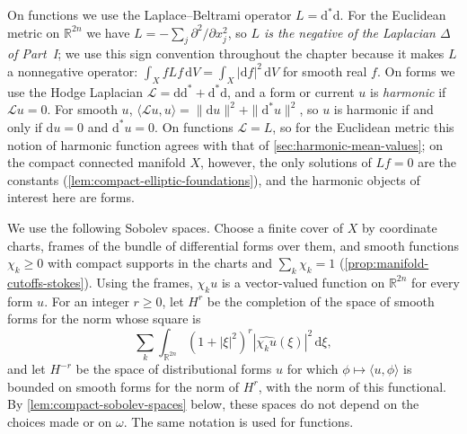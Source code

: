 On functions we use the Laplace--Beltrami operator $L=\mathrm d^*\mathrm d$. For the Euclidean metric on $\mathbb R^{2n}$ we have $L=-\sum_j\partial^2/\partial x_j^2$, so \emph{$L$ is the negative of the Laplacian $\Delta$ of Part~I}; we use this sign convention throughout the chapter because it makes $L$ a nonnegative operator: $\int_XfLf\,\mathrm dV=\int_X|\mathrm df|^2\,\mathrm dV$ for smooth real $f$. On forms we use the Hodge Laplacian $\mathcal L=\mathrm d\mathrm d^*+\mathrm d^*\mathrm d$, and a form or current $u$ is \emph{harmonic} if $\mathcal Lu=0$. For smooth $u$, $\langle\mathcal Lu,u\rangle=\|\mathrm du\|^2+\|\mathrm d^*u\|^2$, so $u$ is harmonic if and only if $\mathrm du=0$ and $\mathrm d^*u=0$. On functions $\mathcal L=L$, so for the Euclidean metric this notion of harmonic function agrees with that of \cref{sec:harmonic-mean-values}; on the compact connected manifold $X$, however, the only solutions of $Lf=0$ are the constants (\cref{lem:compact-elliptic-foundations}), and the harmonic objects of interest here are forms.

We use the following Sobolev spaces. Choose a finite cover of $X$ by coordinate charts, frames of the bundle of differential forms over them, and smooth functions $\chi_k\geq0$ with compact supports in the charts and $\sum_k\chi_k=1$ (\cref{prop:manifold-cutoffs-stokes}). Using the frames, $\chi_ku$ is a vector-valued function on $\mathbb R^{2n}$ for every form $u$. For an integer $r\geq0$, let $H^r$ be the completion of the space of smooth forms for the norm whose square is
\[
 \sum_k\int_{\mathbb R^{2n}}(1+|\xi|^2)^r
       |\widehat{\chi_k u}(\xi)|^2\,\mathrm d\xi,
\]
and let $H^{-r}$ be the space of distributional forms $u$ for which $\phi\mapsto\langle u,\phi\rangle$ is bounded on smooth forms for the norm of $H^r$, with the norm of this functional. By \cref{lem:compact-sobolev-spaces} below, these spaces do not depend on the choices made or on $\omega$. The same notation is used for functions.

